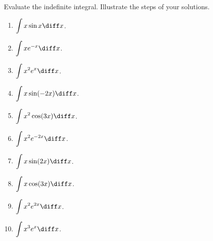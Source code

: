 Evaluate the indefinite integral. Illustrate the steps of your solutions.
\begin{multicols}{2}
\begin{enumerate}[ref={\fcProblemRef}]
\item \label{problemIntegratex*sin(x)dx} $\displaystyle \int x \sin x \diff x$.

\item $\displaystyle \int x e^{-x}\diff x$.


\item \label{problemIntegratex^2e^xdx} $\displaystyle \int x^2 e^x \diff x$.

\item $\displaystyle \int x\sin (-2x)\diff x$.

\item $\displaystyle \int x^2\cos (3x)\diff x$.

\item \label{problemintx^2e^(-2x)dx} $\displaystyle \int x^2 e^{-2x}\diff x$.
\item $\displaystyle \int x \sin (2x)\diff x$.
\item $\displaystyle \int x \cos (3x)\diff x$.
\item $\displaystyle \int x^2 e^{2x}\diff x$.
\item $\displaystyle \int x^3 e^x \diff x$.
\end{enumerate}
\end{multicols}